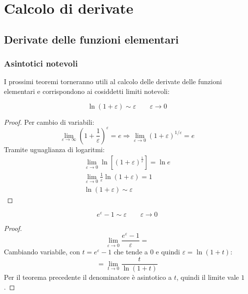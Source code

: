 %
%
%
%


\section{Calcolo di derivate}


\subsection{Derivate delle funzioni elementari}

\subsubsection{Asintotici notevoli}
I prossimi teoremi torneranno utili al calcolo delle derivate delle funzioni elementari e corrispondono ai cosiddetti limiti notevoli:
\begin{teor}
	\label{deriv:nepero}
	\[
		\ln(1+\varepsilon)\sim\varepsilon \qquad \varepsilon\to 0
	\]
\end{teor}
\begin{proof}
	Per cambio di variabili:
	\[
		\lim_{\varepsilon\to\infty} \left(1+\frac{1}{\varepsilon}\right)^\varepsilon=e\Rightarrow\lim_{\varepsilon\to0} (1+\varepsilon)^{1/\varepsilon}=e
	\]
	Tramite uguaglianza di logaritmi:
	\begin{gather*}
		\lim_{\varepsilon\to0} \ln [(1+\varepsilon)^{\frac{1}{\varepsilon}}]=\ln e\\
		\lim_{\varepsilon\to0} \frac{1}{\varepsilon}\ln(1+\varepsilon)=1\\
		\ln(1+\varepsilon)\sim\varepsilon
	\end{gather*}
\end{proof}

\begin{teor}
	\label{deriv:nepero2}
	\[
		e^\varepsilon-1\sim\varepsilon\qquad\varepsilon\to0
	\]
\end{teor}
\begin{proof}
	\[
		\lim_{\varepsilon\to0} \frac{e^\varepsilon-1}{\varepsilon} =
	\]
	Cambiando variabile, con $t=e^\varepsilon-1$ che tende a $0$ e quindi $\varepsilon=\ln(1+t)$:
	\[
		= \lim_{t\to0} \frac{t}{\ln(1+t)}
	\]
	Per il teorema precedente il denominatore è asintotico a $t$, quindi il limite vale $1$.
\end{proof}

